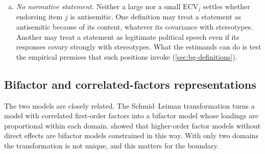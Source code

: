 \begin{enumerate}[(a)]
  \item \emph{No normative statement.} Neither a large nor a small $\mathrm{ECV}_j$ settles whether endorsing item $j$ is antisemitic. One definition may treat a statement as antisemitic because of its content, whatever its covariance with stereotypes. Another may treat a statement as legitimate political speech even if its responses covary strongly with stereotypes. What the estimands can do is test the empirical premises that such positions invoke (\cref{sec:bg-definitions}).
\end{enumerate}

\subsection{Bifactor and correlated-factors representations}\label{sec:model-sl}

The two models are closely related. The Schmid--Leiman transformation \citep{schmid1957} turns a model with correlated first-order factors into a bifactor model whose loadings are proportional within each domain.  showed that higher-order factor models without direct effects are bifactor models constrained in this way. With only two domains the transformation is not unique, and this matters for the boundary.

